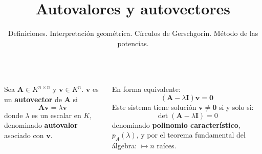 \documentclass[9pt, aspectratio=169]{beamer}
\title{Autovalores y autovectores}
\subtitle{Definiciones. Interpretación geométrica. Círculos de Gerschgorin. Método de las potencias.}
\begin{document}
\maketitle

\begin{frame}
\begin{columns}[t]
\cx
\begin{definition}
    Sea $\bm{A} \in K^{n \times n}$ y $\bm{v} \in K^n$. $\bm{v}$ es un \textbf{autovector} de $\bm{A}$ si 
    \[ \bm{A} \bm{v} = \lambda \bm{v} \]
    donde $\lambda$ es un escalar en $K$, denominado \textbf{autovalor} asociado con $\bm{v}$.
\end{definition}  \pause
En forma equivalente:
\begin{equation}
(\bm{A} - \lambda \bm{I}) \bm{v} = \bm{0}
\label{eq:avv01}
\end{equation}
Este sistema tiene solución $\bm{v} \neq \bm{0}$ si y solo si:
\[ \det(\bm{A} - \lambda \bm{I}) = 0 \]
denominado \textbf{polinomio característico}, $p_A(\lambda)$, y por el teorema fundamental del álgebra: $\mapsto n$ raíces.
\pause  


\end{columns}
\end{frame}
\end{document}
